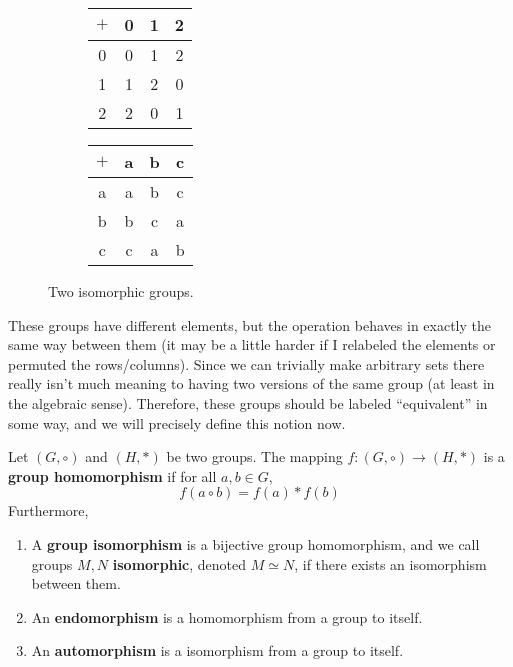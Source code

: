   \begin{figure}[H]
    \centering
    \begin{subfigure}[b]{0.48\textwidth}
      \centering
      \begin{tabular}{c|ccc}
        \hline
        $+$ & 0 & 1 & 2 \\
        \hline
        0 & 0 & 1 & 2 \\
        1 & 1 & 2 & 0 \\
        2 & 2 & 0 & 1 \\
        \hline
      \end{tabular}
    \end{subfigure}
    \hfill 
    \begin{subfigure}[b]{0.48\textwidth}
      \centering
      \begin{tabular}{c|ccc}
        \hline
        $+$ & a & b & c \\
        \hline
        a & a & b & c \\
        b & b & c & a \\
        c & c & a & b \\
        \hline
      \end{tabular}
    \end{subfigure}
    \caption{Two isomorphic groups.}
  \end{figure} 

  These groups have different elements, but the operation behaves in exactly the same way between them (it may be a little harder if I relabeled the elements or permuted the rows/columns). Since we can trivially make arbitrary sets there really isn't much meaning to having two versions of the same group (at least in the algebraic sense). Therefore, these groups should be labeled ``equivalent'' in some way, and we will precisely define this notion now. 

  \begin{definition}
    Let $(G, \circ)$ and $(H, *)$ be two groups. The mapping $f: (G, \circ) \longrightarrow (H, *)$ is a \textbf{group homomorphism} if for all $a, b \in G$, 
    \begin{equation}
      f(a \circ b) = f(a) * f(b)
    \end{equation} 
    Furthermore, 
    \begin{enumerate}
      \item A \textbf{group isomorphism} is a bijective group homomorphism, and we call groups $M, N$ \textbf{isomorphic}, denoted $M \simeq N$, if there exists an isomorphism between them. 
      \item An \textbf{endomorphism} is a homomorphism from a group to itself. 
      \item An \textbf{automorphism} is a isomorphism from a group to itself. 
    \end{enumerate}
  \end{definition} 

